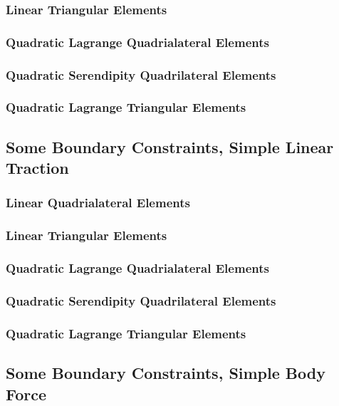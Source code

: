 \documentclass{article}
\begin{document}
    \subsubsection{Linear Triangular Elements}

    \subsubsection{Quadratic Lagrange Quadrialateral Elements}

    \subsubsection{Quadratic Serendipity Quadrilateral Elements}

    \subsubsection{Quadratic Lagrange Triangular Elements}

\subsection{Some Boundary Constraints, Simple Linear Traction}
    \subsubsection{Linear Quadrialateral Elements}

    \subsubsection{Linear Triangular Elements}

    \subsubsection{Quadratic Lagrange Quadrialateral Elements}

    \subsubsection{Quadratic Serendipity Quadrilateral Elements}

    \subsubsection{Quadratic Lagrange Triangular Elements}

\subsection{Some Boundary Constraints, Simple Body Force}
\end{document}
